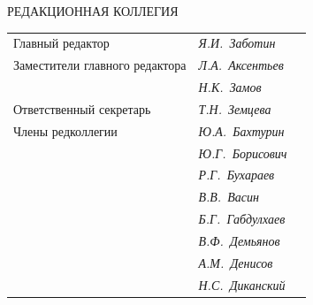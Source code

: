 




\pagestyle{empty}





\bigskip


\bigskip


\centerline{\Large РЕДАКЦИОННАЯ КОЛЛЕГИЯ}


\bigskip


\bigskip


\begin{tabular}{p{63mm}p{40mm}p{50mm}}


Главный редактор               &   \it Я.И.~Заботин & \\


Заместители главного редактора &   \it Л.А.~Аксентьев  & \\


                               &   \it Н.К.~Замов  & \\


Ответственный секретарь        &   \it Т.Н.~Земцева & \\[3mm]


Члены редколлегии              &   \it Ю.А.~Бахтурин  & \\


                               &   \it Ю.Г.~Борисович & \\


                               &   \it Р.Г.~Бухараев & \\


                               &   \it В.В.~Васин  & \\


                               &   \it Б.Г.~Габдулхаев & \\


                               &   \it В.Ф.~Демьянов & \\


                               &   \it А.М.~Денисов & \\


                               &   \it Н.С.~Диканский & \\



\end{tabular}
